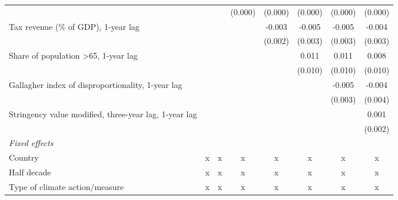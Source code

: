 \begin{tabular}{lccccccc}
                                                                                      &         &             & (0.000)     & (0.000)      & (0.000)       & (0.000)      & (0.000)\\   
   Tax revenue (\% of GDP), 1-year lag                                                &         &             &             & -0.003       & -0.005        & -0.005       & -0.004\\   
                                                                                      &         &             &             & (0.002)      & (0.003)       & (0.003)      & (0.003)\\   
   Share of population >65, 1-year lag                                                &         &             &             &              & 0.011         & 0.011        & 0.008\\   
                                                                                      &         &             &             &              & (0.010)       & (0.010)      & (0.010)\\   
   Gallagher index of disproportionality, 1-year lag                                  &         &             &             &              &               & -0.005       & -0.004\\   
                                                                                      &         &             &             &              &               & (0.003)      & (0.004)\\   
   Stringency value modified, three-year lag, 1-year lag                              &         &             &             &              &               &              & 0.001\\   
                                                                                      &         &             &             &              &               &              & (0.002)\\   
   \emph{Fixed effects}\\
   Country                                                                            & x       & x           & x           & x            & x             & x            & x\\  
   Half decade                                                                        & x       & x           & x           & x            & x             & x            & x\\  
   Type of climate action/measure                                                     & x       & x           & x           & x            & x             & x            & x\\  

\end{tabular}
